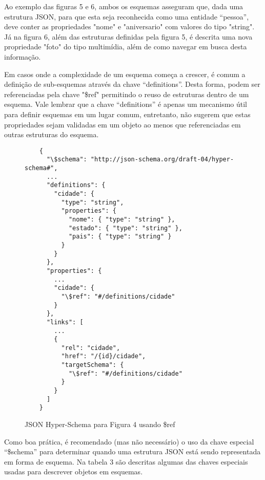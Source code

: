 Ao exemplo das figuras 5 e 6, ambos os esquemas asseguram que, dada uma estrutura JSON, para que esta seja reconhecida como uma entidade “pessoa”, deve conter as propriedades "nome" e "aniversario" com valores do tipo "string". Já na figura 6, além das estruturas definidas pela figura 5, é descrita uma nova propriedade "foto" do tipo multimídia, além de como navegar em busca desta informação.

Em casos onde a complexidade de um esquema começa a crescer, é comum a definição de sub-esquemas através da chave “definitions”. Desta forma, podem ser referenciadas pela chave "\$ref" permitindo o reuso de estruturas dentro de um esquema. Vale lembrar que a chave “definitions” é apenas um mecanismo útil para definir esquemas em um lugar comum, entretanto, não sugerem que estas propriedades sejam validadas em um objeto ao menos que referenciadas em outras estruturas do esquema. \cite{Leach2014}

\begin{figure}[H]
  \centering
  \begin{verbatim}
    {
      "\$schema": "http://json-schema.org/draft-04/hyper-schema#",
      ...
      "definitions": {
        "cidade": {
          "type": "string",
          "properties": {
            "nome": { "type": "string" },
            "estado": { "type": "string" },
            "pais": { "type": "string" }
          }
        }
      },
      "properties": {
        ...
        "cidade": {
          "\$ref": "#/definitions/cidade"
        }
      },
      "links": [
        ...
        {
          "rel": "cidade",
          "href": "/{id}/cidade",
          "targetSchema": {
            "\$ref": "#/definitions/cidade"
          }
        }
      ]
    }
  \end{verbatim}
  \caption{JSON Hyper-Schema para Figura 4 usando \$ref}
\end{figure}

Como boa prática, é recomendado (mas não necessário) o uso da chave especial “\$schema” para determinar quando uma estrutura JSON está sendo representada em forma de esquema. Na tabela 3 são descritas algumas das chaves especiais usadas para descrever objetos em esquemas. \cite{Droettboom2015}

